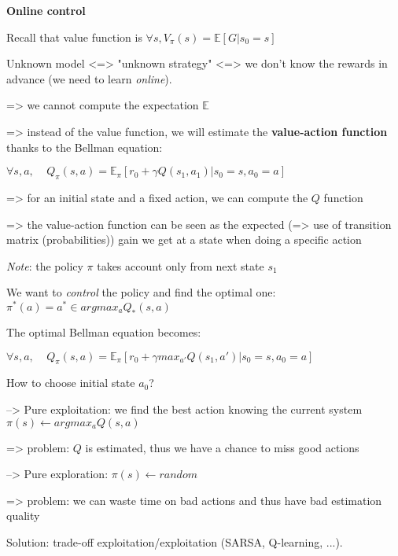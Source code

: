 {\fontsize{12pt}{22pt} \textbf{Online control}\par}

\vspace{5mm}

Recall that value function is $\forall s, V_\pi(s) = \mathbb{E}[G | s_0 = s]$

Unknown model <=> "unknown strategy" <=> we don't know the rewards in advance (we need to learn \textit{online}).

=> we cannot compute the expectation $\mathbb{E}$

=> instead of the value function, we will estimate the \textbf{value-action function} thanks to the Bellman equation:

\begin{center}
$\forall s, a,~~~~~Q_\pi(s,a) = \mathbb{E}_\pi[r_0 + \gamma Q(s_1, a_1) | s_0 = s, a_0 = a]$
\end{center}

=> for an initial state and a fixed action, we can compute the $Q$ function

=> the value-action function can be seen as the expected (=> use of transition matrix (probabilities)) gain we get at a state when doing a specific action

\textit{Note}: the policy $\pi$ takes account only from next state $s_1$

\vspace{5mm}

We want to \textit{control} the policy and find the optimal one: $\pi^*(a) = a^* \in argmax_a Q_*(s,a)$

\vspace{5mm}

The optimal Bellman equation becomes:

\begin{center}
$\forall s, a,~~~~~Q_\pi(s,a) = \mathbb{E}_\pi[r_0 + \gamma max_{a'} Q(s_1, a') | s_0 = s, a_0 = a]$
\end{center}

How to choose initial state $a_0$?

--> Pure exploitation: we find the best action knowing the current system $\pi(s) \leftarrow argmax_a Q(s,a)$

=> problem: $Q$ is estimated, thus we have a chance to miss good actions

--> Pure exploration: $\pi(s) \leftarrow random$

=> problem: we can waste time on bad actions and thus have bad estimation quality

Solution: trade-off  exploitation/exploitation (SARSA, Q-learning, ...).

\vspace{5mm}